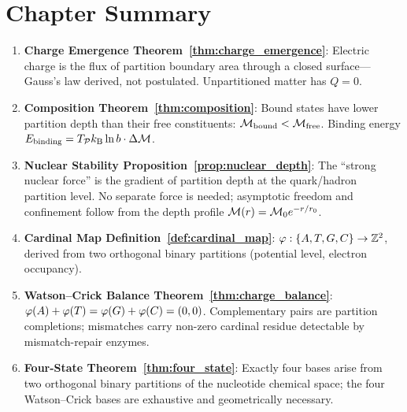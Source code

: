 \section*{Chapter Summary}
\label{sec:ch2_summary}

\begin{chapterbox}[title=Chapter 2 — Key Results Established]
\begin{enumerate}[label=\textbf{\arabic*.}]
  \item \textbf{Charge Emergence Theorem~\ref{thm:charge_emergence}}:
        Electric charge is the flux of partition boundary area through a closed
        surface---Gauss's law derived, not postulated. Unpartitioned matter
        has $Q = 0$.

  \item \textbf{Composition Theorem~\ref{thm:composition}}:
        Bound states have lower partition depth than their free constituents:
        $\mathcal{M}_{\mathrm{bound}} < \mathcal{M}_{\mathrm{free}}$. Binding energy $E_{\mathrm{binding}} = T_{\mathcal{P}} k_{\mathrm{B}} \ln b \cdot \Delta\mathcal{M}$.

  \item \textbf{Nuclear Stability Proposition~\ref{prop:nuclear_depth}}:
        The ``strong nuclear force'' is the gradient of partition depth at the
        quark/hadron partition level. No separate force is needed; asymptotic
        freedom and confinement follow from the depth profile $\mathcal{M}(r) = \mathcal{M}_0 e^{-r/r_0}$.

  \item \textbf{Cardinal Map Definition~\ref{def:cardinal_map}}:
        $\varphi: \{A,T,G,C\} \to \mathbb{Z}^2$, derived from two orthogonal
        binary partitions (potential level, electron occupancy).

  \item \textbf{Watson--Crick Balance Theorem~\ref{thm:charge_balance}}:
        $\varphi(A) + \varphi(T) = \varphi(G) + \varphi(C) = (0,0)$.
        Complementary pairs are partition completions; mismatches carry
        non-zero cardinal residue detectable by mismatch-repair enzymes.

  \item \textbf{Four-State Theorem~\ref{thm:four_state}}:
        Exactly four bases arise from two orthogonal binary partitions of the
        nucleotide chemical space; the four Watson--Crick bases are exhaustive
        and geometrically necessary.


\end{enumerate}
\end{chapterbox}

